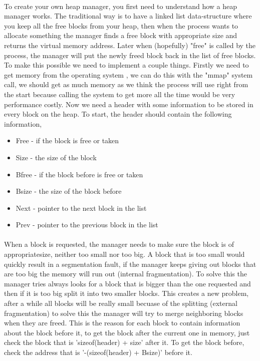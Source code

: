\documentclass[11pt]{article}
\begin{document}
\paragraph{}
To create your own heap manager, you first need to understand how a heap manager works. The traditional way is to have a linked list data-structure 
where you keep all the free blocks from your heap, then when the process wants to allocate something the manager finds a free block with appropriate
size and returns the virtual memory address. Later when (hopefully) "free" is called by the process, the manager will put the newly freed block 
back in the list of free blocks. To make this possible we need to implement a couple things. Firstly we need to get memory from the operating system
, we can do this with the "mmap" system call, we should get as much memory as we think the process will use right from the start because 
calling the system to get more all the time would be very performance costly. Now we need a header with some information to be stored in every block
on the heap. To start, the header should contain the following information,
\begin{itemize}
    \item Free - if the block is free or taken
    \item Size - the size of the block
    \item Bfree - if the block before is free or taken
    \item Bsize - the size of the block before
    \item Next - pointer to the next block in the list
    \item Prev - pointer to the previous block in the list
\end{itemize}

\paragraph{}
When a block is requested, the manager needs to make sure the block is of appropriatesize, neither too small nor too big. A block that is too small would
quickly result in a segmentation fault, if the manager keeps giving out blocks that are too big the memory will run out (internal fragmentation). To solve this the manager tries
always looks for a block that is bigger than the one requested and then if it is too big split it into two smaller blocks. This creates a new problem,
after a while all blocks will be really small becuase of the splitting (external fragmentation) to solve this the manager will try to merge neighboring 
blocks when they are freed. This is the reason for each block to contain information about the block before it, to get the block after the current one in
memory, just check the block that is 'sizeof(header) + size' after it. To get the block before, check the address that is '-(sizeof(header) + Bsize)' before it.
\end{document}
